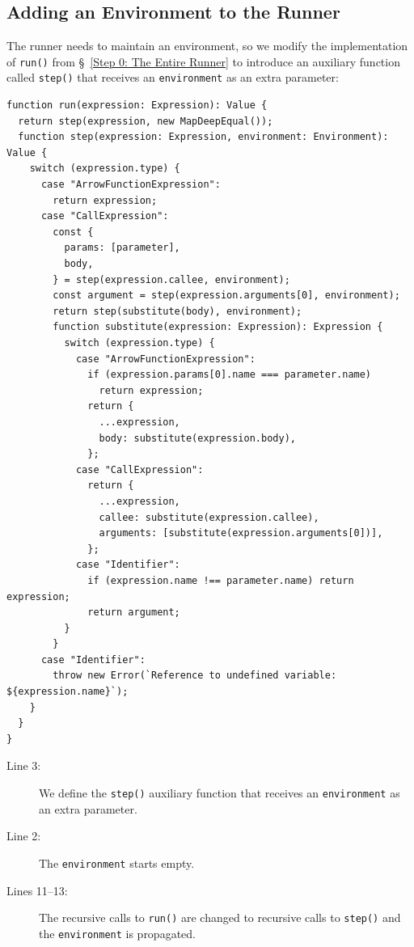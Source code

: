 \documentclass[12pt, oneside]{book}
\begin{document}
\subsection{Adding an Environment to the Runner}

The runner needs to maintain an environment, so we modify the implementation of \texttt{run()} from §~\ref{Step 0: The Entire Runner} to introduce an auxiliary function called \texttt{step()} that receives an \texttt{environment} as an extra parameter:

\begin{verbatim}
function run(expression: Expression): Value {
  return step(expression, new MapDeepEqual());
  function step(expression: Expression, environment: Environment): Value {
    switch (expression.type) {
      case "ArrowFunctionExpression":
        return expression;
      case "CallExpression":
        const {
          params: [parameter],
          body,
        } = step(expression.callee, environment);
        const argument = step(expression.arguments[0], environment);
        return step(substitute(body), environment);
        function substitute(expression: Expression): Expression {
          switch (expression.type) {
            case "ArrowFunctionExpression":
              if (expression.params[0].name === parameter.name)
                return expression;
              return {
                ...expression,
                body: substitute(expression.body),
              };
            case "CallExpression":
              return {
                ...expression,
                callee: substitute(expression.callee),
                arguments: [substitute(expression.arguments[0])],
              };
            case "Identifier":
              if (expression.name !== parameter.name) return expression;
              return argument;
          }
        }
      case "Identifier":
        throw new Error(`Reference to undefined variable: ${expression.name}`);
    }
  }
}
\end{verbatim}

\begin{description}
\item [Line 3:]

We define the \texttt{step()} auxiliary function that receives an \texttt{environment} as an extra parameter.

\item [Line 2:]

The \texttt{environment} starts empty.

\item [Lines 11–13:]

The recursive calls to \texttt{run()} are changed to recursive calls to \texttt{step()} and the \texttt{environment} is propagated.
\end{description}
\end{document}
